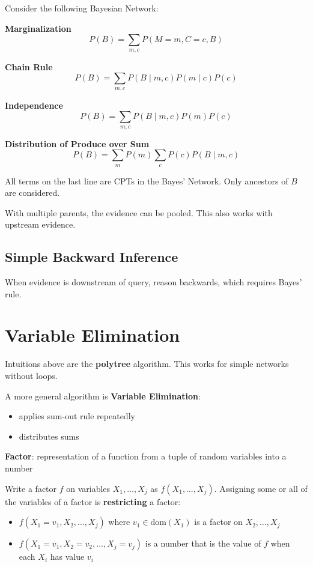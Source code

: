 \documentclass[11pt]{article}
\begin{document}
Consider the following Bayesian Network:

\textbf{Marginalization}
$$ P(B) = \sum_{m, c} P(M = m, C = c, B) $$

\textbf{Chain Rule}
$$ P(B) = \sum_{m, c} P(B \mid m, c) P(m \mid c) P(c) $$

\textbf{Independence}
$$ P(B) = \sum_{m, c} P(B \mid m, c) P(m) P(c) $$

\textbf{Distribution of Produce over Sum}
$$ P(B) = \sum_{m} P(m) \sum_{c} P(c) P(B \mid m, c) $$

All terms on the last line are CPTs in the Bayes' Network.
Only ancestors of \(B\) are considered.

With multiple parents, the evidence can be pooled.
This also works with upstream evidence.
\subsection{Simple Backward Inference}
\label{sec:orgbd4d6d9}
When evidence is downstream of query, reason backwards, which requires Bayes' rule.
\section{Variable Elimination}
\label{sec:org2f4abee}
Intuitions above are the \textbf{polytree} algorithm.
This works for simple networks without loops.

A more general algorithm is \textbf{Variable Elimination}:
\begin{itemize}
\item applies sum-out rule repeatedly
\item distributes sums
\end{itemize}

\textbf{Factor}: representation of a function from a tuple of random variables into a number

Write a factor \(f\) on variables \(X_{1}, \dots, X_{j}\) as \(f(X_{1}, \dots, X_{j})\).
Assigning some or all of the variables of a factor is \textbf{restricting} a factor:
\begin{itemize}
\item \(f(X_{1} = v_{1}, X_{2}, \dots, X_{j})\) where \(v_{1} \in \text{dom}(X_{1})\) is a factor on
\(X_{2}, \dots, X_{j}\)
\item \(f(X_{1} = v_{1}, X_{2} = v_{2}, \dots, X_{j} = v_{j})\) is a number that is the value of \(f\)
when each \(X_{i}\) has value \(v_{i}\)
\end{itemize}
\end{document}

